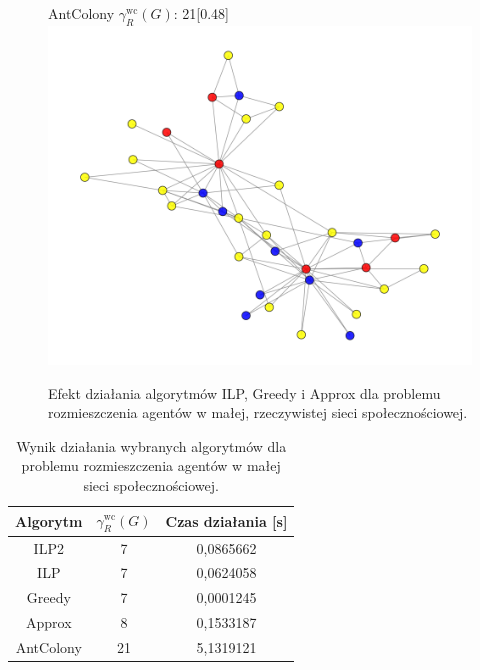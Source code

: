 \begin{figure}[htbp]
    \hfill
    \begin{subcaptionbox}{AntColony  $\gamma^{\text{wc}}_R(G)$: 21\label{fig:ant}}[0.48\linewidth]
        {\includegraphics[width=\linewidth]{assets/Facebook/ant.png}}
    \end{subcaptionbox}

    \caption{Efekt działania algorytmów ILP, Greedy i Approx dla problemu rozmieszczenia agentów w małej, rzeczywistej sieci społecznościowej.}
    \label{fig:karate}
\end{figure}

\begin{table}[H]
    \centering
    \begin{tabular}{|c|c|c|}
        \hline
    Algorytm & $\gamma^{\text{wc}}_R(G)$ & Czas działania [s] \\     \hline
    ILP2 & 7 & 0,0865662 \\ \hline
    ILP & 7 & 0,0624058 \\ \hline
    Greedy & 7 & 0,0001245 \\ \hline
    Approx & 8 & 0,1533187 \\ \hline 
    AntColony & 21 & 5,1319121 \\ \hline
\end{tabular}
\caption{Wynik działania wybranych algorytmów dla problemu rozmieszczenia agentów w małej sieci społecznościowej.}
\end{table}

